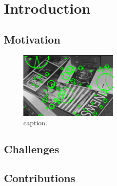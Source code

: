 \chapter{Introduction}
\label{chap:intro}

\section{Motivation}
\label{sect:motivation}

\begin{figure}[!ht]
	\centering
	\includegraphics[width=0.9\linewidth]{image.jpg}
	\caption{caption.}
	\label{img:example}
\end{figure}

\section{Challenges}

\section{Contributions}
